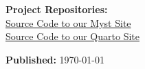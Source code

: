 \begin{titlepage}
\vfill

\vspace{0.5cm}

{\normalsize
\textbf{Project Repositories:}\\[0.2cm]
\href{https://github.com/UW-Madison-DSI/open_source_survey_results_myst.git}{Source Code to our Myst Site}\\[0.2cm]
\href{https://github.com/UW-Madison-DSI/open_source_survey_results.git}{Source Code to our Quarto Site}
\par}

\vspace{0.3cm}

{\large\textbf{Published:} \today\par}

\vspace{0.5cm}

\end{titlepage}

\newpage
